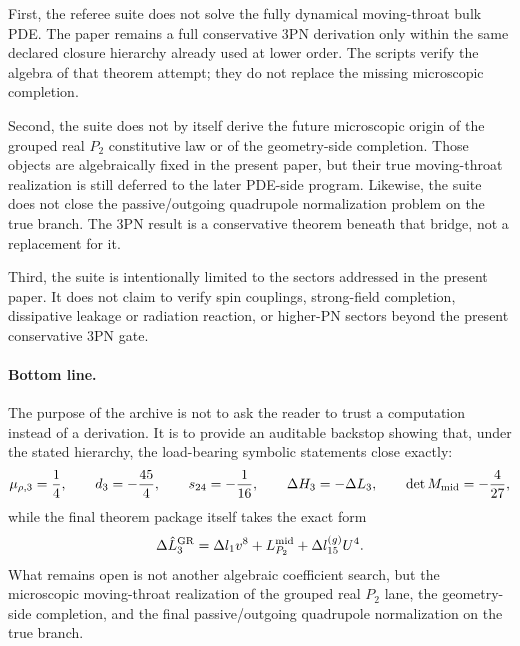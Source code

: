 \documentclass[11pt]{article}
\begin{document}
First, the referee suite does not solve the fully dynamical moving-throat bulk
PDE.  The paper remains a full conservative $3$PN derivation only within the
same declared closure hierarchy already used at lower order.  The scripts verify
the algebra of that theorem attempt; they do not replace the missing
microscopic completion.

Second, the suite does not by itself derive the future microscopic origin of the
grouped real $P_2$ constitutive law or of the geometry-side completion.  Those
objects are algebraically fixed in the present paper, but their true
moving-throat realization is still deferred to the later PDE-side program.
Likewise, the suite does not close the passive/outgoing quadrupole normalization
problem on the true branch.  The $3$PN result is a conservative theorem beneath
that bridge, not a replacement for it.

Third, the suite is intentionally limited to the sectors addressed in the
present paper.  It does not claim to verify spin couplings, strong-field
completion, dissipative leakage or radiation reaction, or higher-PN sectors
beyond the present conservative $3$PN gate.

\paragraph{Bottom line.}
The purpose of the archive is not to ask the reader to trust a computation
instead of a derivation.  It is to provide an auditable backstop showing that,
under the stated hierarchy, the load-bearing symbolic statements close exactly:
\begin{equation}
\mu_{\rho,3}=\frac14,
\qquad
 d_3=-\frac{45}{4},
\qquad
 s_{24}=-\frac1{16},
\qquad
\Delta H_3=-\Delta L_3,
\qquad
\det M_{\rm mid}=-\frac{4}{27},
\label{eq:verification-bottom-line-ledger}
\end{equation}
while the final theorem package itself takes the exact form
\begin{equation}
\Delta \hat L_3^{\rm GR}
=
\Delta l_1 v^8
+
L_{P_2}^{\rm mid}
+
\Delta l_{15}^{(g)}U^4.
\label{eq:verification-bottom-line-split}
\end{equation}
What remains open is not another algebraic coefficient search, but the
microscopic moving-throat realization of the grouped real $P_2$ lane, the
geometry-side completion, and the final passive/outgoing quadrupole
normalization on the true branch.

\end{document}
